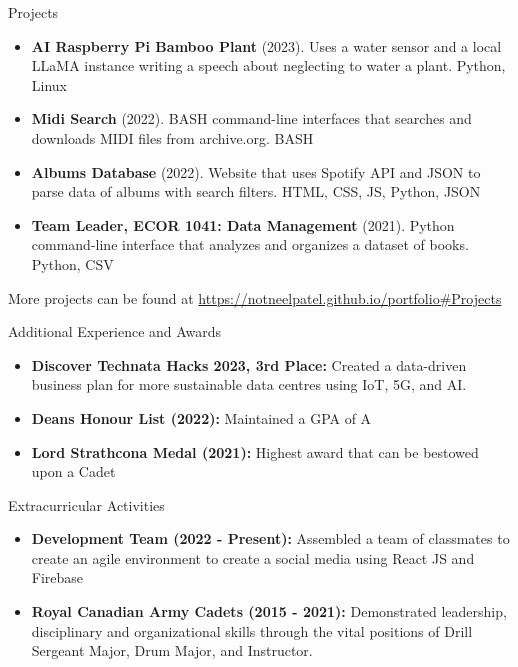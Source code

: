 \documentclass[]{mcdowellcv}
\begin{document}
	\begin{cvsection}{Projects}
		\begin{cvsubsection}{}{}{}
			\begin{itemize}
				\item \textbf{AI Raspberry Pi Bamboo Plant} (2023). Uses a water sensor and a local LLaMA instance writing a speech about neglecting to water a plant. Python, Linux
				\item \textbf{Midi Search} (2022). BASH command-line interfaces that searches and downloads MIDI files from archive.org. BASH
				\item \textbf{Albums Database} (2022). Website that uses Spotify API and JSON to parse data of albums with search filters. HTML, CSS, JS, Python, JSON
				\item \textbf{Team Leader, ECOR 1041: Data Management} (2021). Python command-line interface that analyzes and organizes a dataset of books. Python, CSV
			\end{itemize}
			
				More projects can be found at \url{https://notneelpatel.github.io/portfolio#Projects}
		\end{cvsubsection}
	\end{cvsection}
	
	\begin{cvsection}{Additional Experience and Awards}
		\begin{cvsubsection}{}{}{}	
			\begin{itemize}
				\item \textbf{Discover Technata Hacks 2023, 3rd Place:} Created a data-driven business plan for more sustainable data centres using IoT, 5G, and AI.  
				\item \textbf {Deans Honour List (2022):} Maintained a GPA of A
				\item \textbf{Lord Strathcona Medal (2021):} Highest award that can be bestowed upon a Cadet
			\end{itemize}
		\end{cvsubsection}
	\end{cvsection}
	
	\begin{cvsection}{Extracurricular Activities}
		\begin{cvsubsection}{}{}{}
			\begin{itemize}
				\item \textbf{Development Team (2022 - Present):} Assembled a team of classmates to create an agile environment to create a social media using React JS and Firebase
				\item \textbf{Royal Canadian Army Cadets (2015 - 2021):} Demonstrated leadership, disciplinary and organizational skills through the vital positions of Drill Sergeant Major, Drum Major, and Instructor.
			\end{itemize}
		\end{cvsubsection}
	\end{cvsection}
\end{document}
